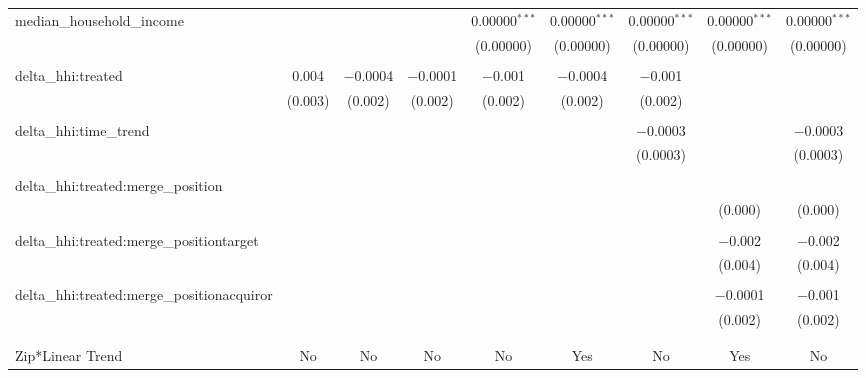 \begin{table}[H]
{\begin{tabular}{@{\extracolsep{5pt}}lcccccccc}
  median\_household\_income &  &  &  & 0.00000$^{***}$ & 0.00000$^{***}$ & 0.00000$^{***}$ & 0.00000$^{***}$ & 0.00000$^{***}$ \\  

   &  &  &  & (0.00000) & (0.00000) & (0.00000) & (0.00000) & (0.00000) \\  

   & & & & & & & & \\  

  delta\_hhi:treated & 0.004 & $-$0.0004 & $-$0.0001 & $-$0.001 & $-$0.0004 & $-$0.001 &  &  \\  

   & (0.003) & (0.002) & (0.002) & (0.002) & (0.002) & (0.002) &  &  \\  

   & & & & & & & & \\  

  delta\_hhi:time\_trend &  &  &  &  &  & $-$0.0003 &  & $-$0.0003 \\  

   &  &  &  &  &  & (0.0003) &  & (0.0003) \\  

   & & & & & & & & \\  

  delta\_hhi:treated:merge\_position &  &  &  &  &  &  &  &  \\  

   &  &  &  &  &  &  & (0.000) & (0.000) \\  

   & & & & & & & & \\  

  delta\_hhi:treated:merge\_positiontarget &  &  &  &  &  &  & $-$0.002 & $-$0.002 \\  

   &  &  &  &  &  &  & (0.004) & (0.004) \\  

   & & & & & & & & \\  

  delta\_hhi:treated:merge\_positionacquiror &  &  &  &  &  &  & $-$0.0001 & $-$0.001 \\  

   &  &  &  &  &  &  & (0.002) & (0.002) \\  

   & & & & & & & & \\  

 \hline \\[-1.8ex]  

 Zip*Linear Trend & No & No & No & No & Yes & No & Yes & No \\  


\end{tabular}}
\end{table}
